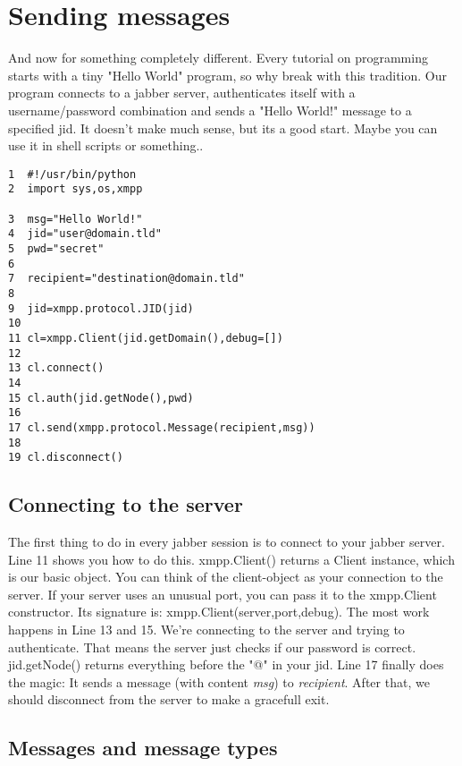 \section{Sending messages}

And now for something completely different.
Every tutorial on programming starts with a tiny "Hello World" program, so why break with this tradition.
Our program connects to a jabber server, authenticates itself with a username/password combination and sends a "Hello
World!" message to a specified jid. It doesn't make much sense, but its a good start. Maybe you can use it  in shell scripts or something..

\begin{verbatim}
1  #!/usr/bin/python
2  import sys,os,xmpp

3  msg="Hello World!"
4  jid="user@domain.tld"
5  pwd="secret"
6
7  recipient="destination@domain.tld"
8
9  jid=xmpp.protocol.JID(jid)
10
11 cl=xmpp.Client(jid.getDomain(),debug=[])
12
13 cl.connect()
14
15 cl.auth(jid.getNode(),pwd)
16
17 cl.send(xmpp.protocol.Message(recipient,msg))
18
19 cl.disconnect()
\end{verbatim}
\newpage
\subsection{Connecting to the server}
The first thing to do in every jabber session is to connect to your jabber server.
Line 11 shows you how to do this. xmpp.Client() returns a Client instance, which is our basic object.
You can think of the client-object as your connection to the server. If your server uses an unusual port, you can pass it to the xmpp.Client constructor. Its signature is: xmpp.Client(server,port,debug).
\newline
\newline
The most work happens in Line 13 and 15. We're connecting to the server and trying to authenticate. That means the server just checks if our password is correct. jid.getNode() returns everything before the "@" in your jid.
\newline
\newline
Line 17 finally does the magic: It sends a message (with content \textit{msg}) to \textit{recipient}.
After that, we should disconnect from the server to make a gracefull exit.

\subsection{Messages and message types}

